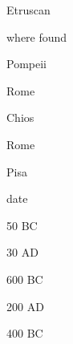 \documentclass[compress,color=usenames]{beamer}
\begin{document}
\begin{frame}
Etruscan










where found



Pompeii



Rome



Chios



Rome



Pisa






date



50 BC



30 AD



600 BC



200 AD



400 BC










\end{frame}
\end{document}
